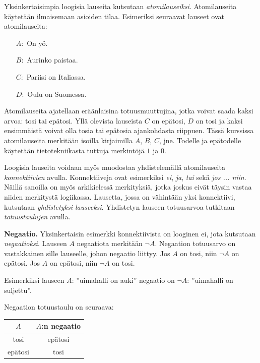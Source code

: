\bigskip

Yksinkertaisimpia loogisia lauseita kutsutaan {\em atomilauseiksi}. Atomilauseita käytetään ilmaisemaan asioiden tilaa. Esimeriksi seuraavat lauseet ovat atomilauseita:
\begin{itemize}
\item[$A:$] On yö.
\item[$B:$] Aurinko paistaa.
\item[$C:$] Pariisi on Italiassa.
\item[$D:$] Oulu on Suomessa.
\end{itemize}
Atomilauseita ajatellaan eräänlaisina totuusmuuttujina, jotka voivat saada kaksi arvoa: tosi tai epätosi. Yllä olevista lauseista $C$ on epätosi, $D$ on tosi ja kaksi ensimmäistä voivat olla tosia tai epätosia ajankohdasta riippuen. Tässä kurssissa atomilauseita merkitään isoilla kirjaimilla $A$, $B$, $C$, jne. Todelle ja epätodelle käytetään tietotekniikasta tuttuja merkintöjä $1$ ja $0$.

Loogisia lauseita voidaan myös muodostaa yhdistelemällä atomilauseita {\em konnektiivien} avulla. Konnektiiveja ovat esimerkiksi \emph{ei}, \emph{ja}, \emph{tai} sekä \emph{jos ... niin}. Näillä sanoilla on myös arkikielessä merkityksiä, jotka joskus eivät täysin vastaa niiden merkitystä logiikassa. Lausetta, jossa on vähintään yksi konnektiivi, kutsutaan {\em yhdistetyksi lauseeksi}. Yhdistetyn lauseen totuusarvoa tutkitaan \emph{totuustaulujen} avulla.

{\bf Negaatio.} Yksinkertaisin esimerkki konnektiivista on looginen ei, jota kutsutaan {\em negaatioksi}. Lauseen $A$ negaatiota merkitään $\lnot A$. Negaation totuusarvo on vastakkainen sille lauseelle, johon negaatio liittyy. Jos $A$ on tosi, niin $\lnot A$ on epätosi. Jos $A$ on epätosi, niin $\lnot A$ on tosi.

Esimerkiksi lauseen $A$: ''uimahalli on auki'' negaatio on $\lnot A$: ''uimahalli on suljettu''.

Negaation totuustaulu on seuraava:


\bigskip

\begin{center}
\begin{tabular}{|c|c|}\hline
$A$ & $A$:n negaatio \\ \hline
tosi & epätosi \\ 
epätosi & tosi \\
\hline
\end{tabular}
\end{center}

